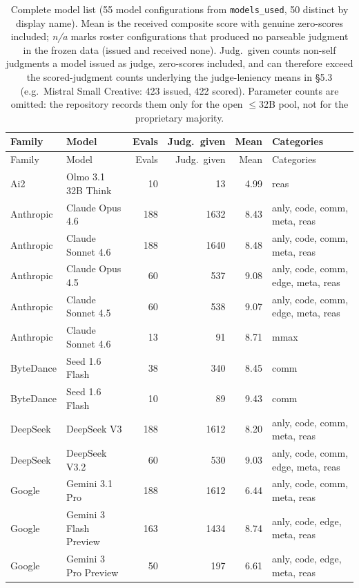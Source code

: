 \footnotesize
\begin{longtable}{llrrrp{3.0cm}}
\caption{Complete model list (55 model configurations from \texttt{models\_used}, 50 distinct by display name). Mean is the received composite score with genuine zero-scores included; \emph{n/a} marks roster configurations that produced no parseable judgment in the frozen data (issued and received none). Judg.\ given counts non-self judgments a model issued as judge, zero-scores included, and can therefore exceed the scored-judgment counts underlying the judge-leniency means in \S5.3 (e.g.\ Mistral Small Creative: 423 issued, 422 scored). Parameter counts are omitted: the repository records them only for the open $\leq$32B pool, not for the proprietary majority.}\label{tab:models}\\
\toprule
Family & Model & Evals & Judg.\ given & Mean & Categories \\
\midrule
\endfirsthead
\toprule
Family & Model & Evals & Judg.\ given & Mean & Categories \\
\midrule
\endhead
\midrule
\endfoot
\bottomrule
\endlastfoot
Ai2 & Olmo 3.1 32B Think & 10 & 13 & 4.99 & reas \\
Anthropic & Claude Opus 4.6 & 188 & 1632 & 8.43 & anly, code, comm, meta, reas \\
Anthropic & Claude Sonnet 4.6 & 188 & 1640 & 8.48 & anly, code, comm, meta, reas \\
Anthropic & Claude Opus 4.5 & 60 & 537 & 9.08 & anly, code, comm, edge, meta, reas \\
Anthropic & Claude Sonnet 4.5 & 60 & 538 & 9.07 & anly, code, comm, edge, meta, reas \\
Anthropic & Claude Sonnet 4.6 & 13 & 91 & 8.71 & mmax \\
ByteDance & Seed 1.6 Flash & 38 & 340 & 8.45 & comm \\
ByteDance & Seed 1.6 Flash & 10 & 89 & 9.43 & comm \\
DeepSeek & DeepSeek V3 & 188 & 1612 & 8.20 & anly, code, comm, meta, reas \\
DeepSeek & DeepSeek V3.2 & 60 & 530 & 9.03 & anly, code, comm, edge, meta, reas \\
Google & Gemini 3.1 Pro & 188 & 1612 & 6.44 & anly, code, comm, meta, reas \\
Google & Gemini 3 Flash Preview & 163 & 1434 & 8.74 & anly, code, edge, meta, reas \\
Google & Gemini 3 Pro Preview & 50 & 197 & 6.61 & anly, code, edge, meta, reas \\

\end{longtable}
